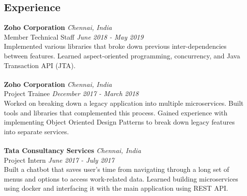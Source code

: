 \documentclass{resume}
\begin{document}
\begin{multicols*}{2}
\section*{Experience}
\noindent
\textbf{Zoho Corporation} \hfill \textit{Chennai, India} \\
{\small Member Technical Staff} \hfill \textit{\small June 2018 - May 2019}  \\
Implemented various libraries that broke down previous inter-dependencies between features. Learned aspect-oriented programming, concurrency, and Java Transaction API (JTA). \\
\\
\textbf{Zoho Corporation} \hfill \textit{Chennai, India} \\
{\small Project Trainee} \hfill \textit{\small December 2017 - March 2018}  \\
Worked on breaking down a legacy application into multiple microservices. Built tools and libraries that complemented this process. Gained experience with implementing Object Oriented Design Patterns to break down legacy features into separate services. \\
\\
\textbf{Tata Consultancy Services} \hfill \textit{Chennai, India} \\
{\small Project Intern} \hfill \textit{\small June 2017 - July 2017}  \\
Built a chatbot that saves user’s time from navigating through a long set of menus and options to access work-related data. Learned building microservices using docker and interfacing it with the main application using REST API. \\


\end{multicols*}
\end{document}
